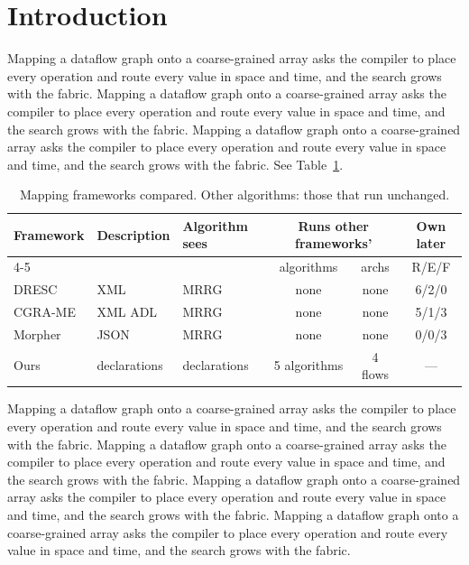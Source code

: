 \documentclass[twocolumn]{article}
\begin{document}
\section{Introduction}
Mapping a dataflow graph onto a coarse-grained array asks the compiler to place every operation and route every value in space and time, and the search grows with the fabric. Mapping a dataflow graph onto a coarse-grained array asks the compiler to place every operation and route every value in space and time, and the search grows with the fabric. Mapping a dataflow graph onto a coarse-grained array asks the compiler to place every operation and route every value in space and time, and the search grows with the fabric. See Table~\ref{tab:fw}.

\begin{table}[t]
  \caption{Mapping frameworks compared. Other algorithms: those that run unchanged.}
  \label{tab:fw}
  \centering
  \footnotesize
  \setlength{\tabcolsep}{3pt}
  \begin{tabular}{@{}lllccc@{}}
    \toprule
    Framework & Description & Algorithm sees & \multicolumn{2}{c}{Runs other frameworks'} & Own later \\
    \cmidrule(lr){4-5}
    & & & algorithms & archs & R/E/F \\
    \midrule
    DRESC~\cite{k01} & XML & MRRG & none & none & 6/2/0 \\
    CGRA-ME~\cite{k02,k03} & XML ADL & MRRG & none & none & 5/1/3 \\
    Morpher~\cite{k04} & JSON & MRRG & none & none & 0/0/3 \\
    \midrule
    Ours & declarations & declarations & 5 algorithms & 4 flows & --- \\
    \bottomrule
  \end{tabular}
\end{table}

Mapping a dataflow graph onto a coarse-grained array asks the compiler to place every operation and route every value in space and time, and the search grows with the fabric. Mapping a dataflow graph onto a coarse-grained array asks the compiler to place every operation and route every value in space and time, and the search grows with the fabric. Mapping a dataflow graph onto a coarse-grained array asks the compiler to place every operation and route every value in space and time, and the search grows with the fabric. Mapping a dataflow graph onto a coarse-grained array asks the compiler to place every operation and route every value in space and time, and the search grows with the fabric.
\end{document}
